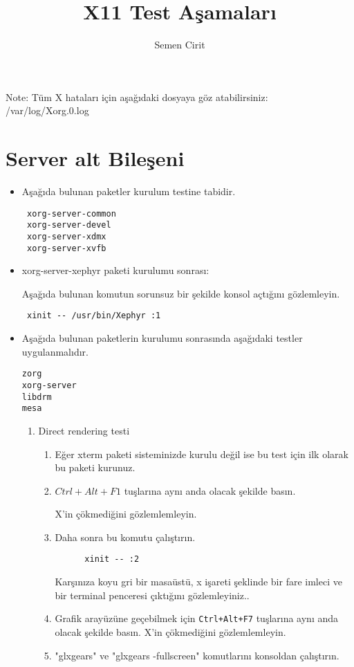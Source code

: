 \documentclass[a4paper,10pt]{article}
\title{X11 Test Aşamaları}
\author{Semen Cirit}
\begin{document}
\maketitle

 Note:	
  	Tüm X hataları için  aşağıdaki dosyaya göz atabilirsiniz:
	/var/log/Xorg.0.log  

\section{Server alt Bileşeni}

\begin{itemize}
 \item Aşağıda bulunan paketler kurulum testine tabidir.
\begin{verbatim}
 xorg-server-common
 xorg-server-devel
 xorg-server-xdmx
 xorg-server-xvfb
\end{verbatim}

 \item xorg-server-xephyr paketi kurulumu sonrası:

Aşağıda bulunan komutun sorunsuz bir şekilde konsol açtığını gözlemleyin.
\begin{verbatim}
 xinit -- /usr/bin/Xephyr :1
\end{verbatim}

\item  Aşağıda bulunan paketlerin kurulumu sonrasında aşağıdaki testler uygulanmalıdır. 
\begin{verbatim}
zorg    
xorg-server
libdrm
mesa
\end{verbatim}


\begin{enumerate}
  \item Direct rendering testi
    \begin{enumerate}
    \item Eğer xterm paketi sisteminizde kurulu değil ise bu test için ilk olarak bu paketi kurunuz.
    \item   $Ctrl+Alt+F1$ tuşlarına aynı anda olacak şekilde basın.

	    X'in çökmediğini gözlemlemleyin.
    \item  Daha sonra bu komutu çalıştırın.
	  \begin{verbatim}
	  xinit -- :2
	  \end{verbatim}
	  Karşınıza koyu gri bir masaüstü, x işareti şeklinde bir fare imleci ve bir terminal penceresi çıktığını gözlemleyiniz..
    \item Grafik arayüzüne geçebilmek için \texttt{Ctrl+Alt+F7} tuşlarına aynı anda olacak şekilde basın.    
	   X'in çökmediğini gözlemlemleyin.
    \item "glxgears" ve "glxgears -fullscreen" komutlarını konsoldan çalıştırın.


\end{enumerate}
\end{enumerate}
\end{itemize}
\end{document}
